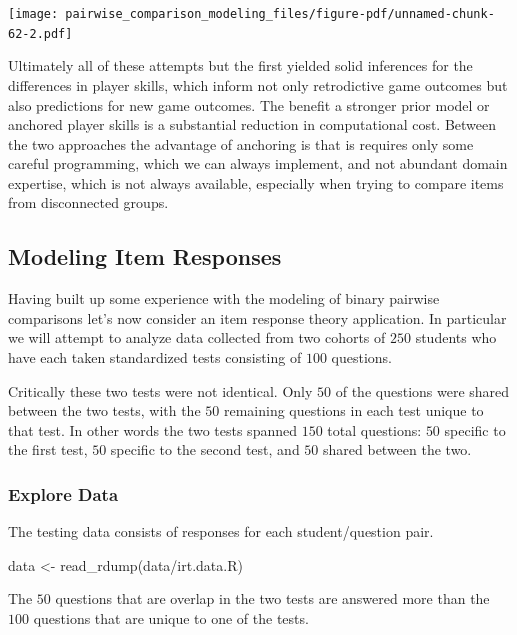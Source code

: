 \documentclass[
  letterpaper,
  DIV=11,
  numbers=noendperiod]{scrartcl}
\newenvironment{Shaded}{\begin{snugshade}}{\end{snugshade}}
\newcommand{\FunctionTok}[1]{\textcolor[rgb]{0.28,0.35,0.67}{#1}}
\newcommand{\NormalTok}[1]{\textcolor[rgb]{0.00,0.23,0.31}{#1}}
\newcommand{\OtherTok}[1]{\textcolor[rgb]{0.00,0.23,0.31}{#1}}
\newcommand{\StringTok}[1]{\textcolor[rgb]{0.13,0.47,0.30}{#1}}
\begin{document}
\texttt{[image: pairwise\_comparison\_modeling\_files/figure-pdf/unnamed-chunk-62-2.pdf]}

Ultimately all of these attempts but the first yielded solid inferences
for the differences in player skills, which inform not only retrodictive
game outcomes but also predictions for new game outcomes. The benefit a
stronger prior model or anchored player skills is a substantial
reduction in computational cost. Between the two approaches the
advantage of anchoring is that is requires only some careful
programming, which we can always implement, and not abundant domain
expertise, which is not always available, especially when trying to
compare items from disconnected groups.

\subsection{Modeling Item Responses}\label{sec:demo-irt}

Having built up some experience with the modeling of binary pairwise
comparisons let's now consider an item response theory application. In
particular we will attempt to analyze data collected from two cohorts of
\(250\) students who have each taken standardized tests consisting of
\(100\) questions.

Critically these two tests were not identical. Only \(50\) of the
questions were shared between the two tests, with the \(50\) remaining
questions in each test unique to that test. In other words the two tests
spanned \(150\) total questions: \(50\) specific to the first test,
\(50\) specific to the second test, and \(50\) shared between the two.

\subsubsection{Explore Data}\label{sec:irt-data-expl}

The testing data consists of responses for each student/question pair.

\begin{Shaded}
\begin{Highlighting}[]
\NormalTok{data }\OtherTok{\textless{}{-}} \FunctionTok{read\_rdump}\NormalTok{(}\StringTok{\textquotesingle{}data/irt.data.R\textquotesingle{}}\NormalTok{)}
\end{Highlighting}
\end{Shaded}

The \(50\) questions that are overlap in the two tests are answered more
than the \(100\) questions that are unique to one of the tests.
\end{document}
